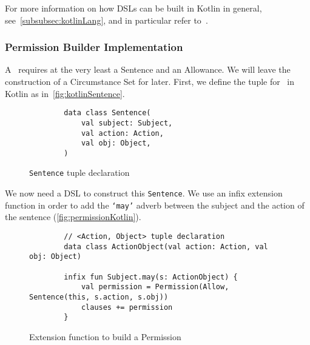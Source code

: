 For more information on how DSLs can be built in Kotlin in general, see~\autoref{subsubsec:kotlinLang}, and in particular refer to~\cite{kotlinTypeSafeBuilders}.

\subsubsection{Permission Builder Implementation}

A~ requires at the very least a Sentence and an Allowance.
We will leave the construction of a Circumstance Set for later.
First, we define the tuple for~ in Kotlin as in~\autoref{fig:kotlinSentence}.

\begin{figure}[h]
    \centering
    \begin{minipage}{0.4\textwidth}
        \begin{verbatim}
        data class Sentence(
            val subject: Subject,
            val action: Action,
            val obj: Object,
        )
        \end{verbatim}
    \end{minipage}
    \caption{\texttt{Sentence} tuple declaration}\label{fig:kotlinSentence}
\end{figure}

We now need a DSL to construct this \texttt{Sentence}.
We use an infix extension function in order to add the \texttt{`may'} adverb between the subject and the action of the sentence (\autoref{fig:permissionKotlin}).


\begin{figure}[h]
    \centering
    \begin{minipage}{\textwidth}
        \begin{verbatim}
        // <Action, Object> tuple declaration
        data class ActionObject(val action: Action, val obj: Object)

        infix fun Subject.may(s: ActionObject) {
            val permission = Permission(Allow, Sentence(this, s.action, s.obj))
            clauses += permission
        }
        \end{verbatim}
    \end{minipage}
    \caption{Extension function to build a Permission}\label{fig:permissionKotlin}
\end{figure}



